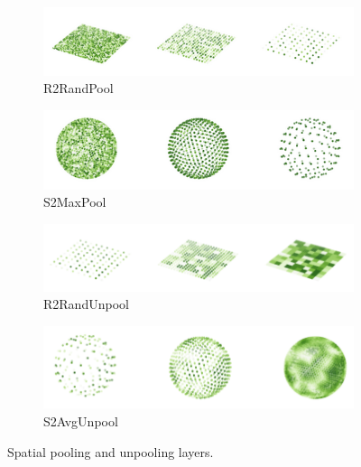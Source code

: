 \documentclass{article}
\begin{document}
\begin{figure}[h!] 
    \centering
    \begin{subfigure}[b]{0.48\textwidth}
        \centering
        \includegraphics[width=\textwidth]{Images/r2_pooling.png}
        \caption{R2RandPool}
    \end{subfigure}
    \hfill
    \begin{subfigure}[b]{0.48\textwidth}
        \centering
        \includegraphics[width=\textwidth]{Images/s2_pooling.png}
        \caption{S2MaxPool}
    \end{subfigure}
    \hfill
    \begin{subfigure}[b]{0.48\textwidth}
        \centering
        \includegraphics[width=\textwidth]{Images/r2_unpooling.png}
        \caption{R2RandUnpool}
    \end{subfigure}
    \hfill
    \begin{subfigure}[b]{0.48\textwidth}
        \centering
        \includegraphics[width=\textwidth]{Images/s2_unpooling.png}
        \caption{S2AvgUnpool}
    \end{subfigure}
    \caption{Spatial pooling and unpooling layers.}
    \label{fig:pooling}
\end{figure}
\end{document}
